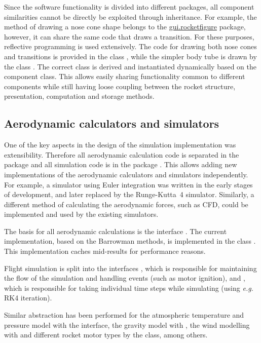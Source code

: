Since the software functionality is divided into different packages,
all component similarities cannot be directly be exploited through
inheritance.  For example, the method of drawing a nose cone shape
belongs to the \url{gui.rocketfigure} package, however, it can share
the same code that draws a transition.  For these purposes, reflective
programming is used extensively.  The code for drawing both nose cones
and transitions is provided in the class
, while the simpler
body tube is drawn by the class .  The correct
class is derived and instantiated dynamically based on the component
class.  This allows easily sharing functionality common to different
components while still having loose coupling between the rocket
structure, presentation, computation and storage methods.




\subsection{Aerodynamic calculators and simulators}
\label{sec-simulator-calculator}

One of the key aspects in the design of the simulation implementation
was extensibility.  Therefore all aerodynamic calculation code is
separated in the package  and all simulation code
is in the package .  This allows adding new
implementations of the aerodynamic calculators and simulators
independently.  For example, a simulator using Euler integration was
written in the early stages of development, and later replaced by the
Runge-Kutta~4 simulator.  Similarly, a different method of calculating
the aerodynamic forces, such as CFD, could be implemented and used by
the existing simulators.

The basis for all aerodynamic calculations is the interface
.  The current implementation, based on
the Barrowman methods, is implemented in the class
.  This implementation caches mid-results
for performance reasons.

Flight simulation is split into the
interfaces , which is responsible for
maintaining the flow of the simulation and handling events (such as
motor ignition), and , which is responsible
for taking individual time steps while simulating (using {\it e.g.}
RK4 iteration).

Similar abstraction has been performed for the atmospheric temperature
and pressure model with the  interface, the
gravity model with , the wind modelling with
 and different rocket motor types by the
 class, among others.





